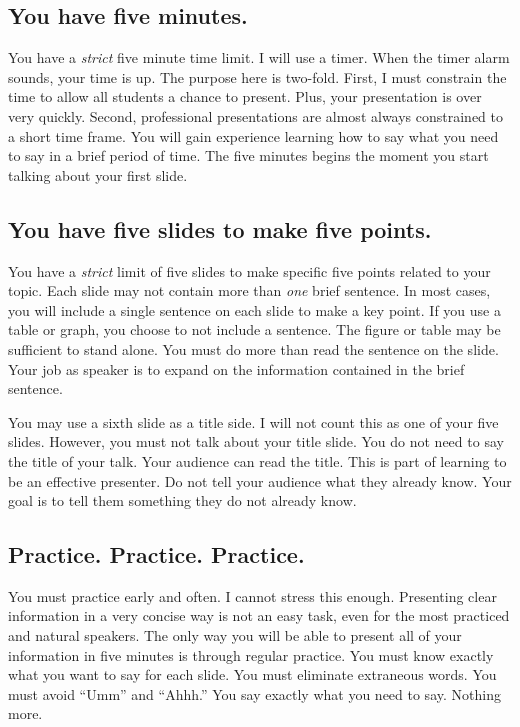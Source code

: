 \documentclass[letterpaper]{memoir}
\newcommand{\insertslide}[2]{%
  \framebox{\texttt{[image: \#2]}}
}
\begin{document}
\subsection*{You have five minutes.}

\sidepar{\insertslide{3}{5_in_5_overview.pdf}}
You have a \emph{strict} five minute time limit. I will use a timer. When the timer alarm sounds, your time is up. The purpose here is two-fold. First, I must constrain the time to allow all students a chance to present. Plus, your presentation is over very quickly. Second, professional presentations are almost always constrained to a short time frame. You will gain experience learning how to say what you need to say in a brief period of time.  The five minutes begins the moment you start talking about your first slide. 

\subsection*{You have five slides to make five points.}

\sidepar{\insertslide{5}{5_in_5_overview.pdf}}
You have a \emph{strict} limit of five slides to make specific five points related to your topic. Each slide may not contain more than \emph{one} brief sentence. In most cases, you will include a single sentence on each slide to make a key point. If you use a table or graph, you choose to not include a sentence. The figure or table may be sufficient to stand alone.  You must do more than read the sentence on the slide. Your job as speaker is to expand on the information contained in the brief sentence. 
 
You may use a sixth slide as a title side. I will not count this as one of your five slides. However, you must not talk about your title slide. You do not need to say the title of your talk. Your audience can read the title. This is part of learning to be an effective presenter. Do not tell your audience what they already know. Your goal is to tell them something they do not already know.

\subsection*{Practice. Practice. Practice.}

\sidepar{\insertslide{8}{5_in_5_overview.pdf}}
You must practice early and often. I cannot stress this enough. Presenting clear information in a very concise way is not an easy task, even for the most practiced and natural speakers. The only way you will be able to present all of your information in five minutes is through regular practice. You must know exactly what you want to say for each slide. You must eliminate extraneous words. You must avoid “Umm” and “Ahhh.” You say exactly what you need to say. Nothing more. 
\end{document}
